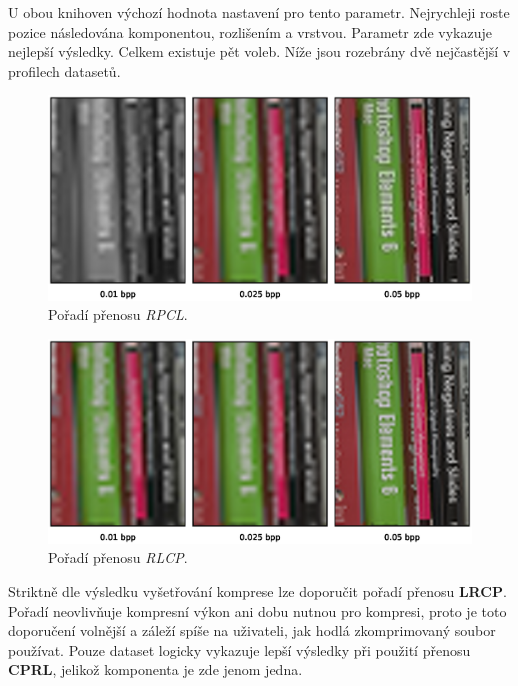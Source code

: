 U obou knihoven výchozí hodnota nastavení pro tento parametr. Nejrychleji roste pozice následována komponentou, rozlišením a vrstvou. Parametr zde vykazuje nejlepší výsledky. Celkem existuje pět voleb. Níže jsou rozebrány dvě nejčastější v profilech datasetů.
\clearpage
\begin{figure}[hbt!]
  \centering
  \hspace*{-0.75cm}
  \includegraphics[width=16cm]{obrazky-figures/order/rpcl.eps}
  \caption{Pořadí přenosu \textit{RPCL}.}
\end{figure}

\begin{figure}[hbt!]
  \centering
  \hspace*{-0.75cm}
  \includegraphics[width=16cm]{obrazky-figures/order/rlcp.eps}
  \caption{Pořadí přenosu \textit{RLCP}.}
\end{figure}

\noindent Striktně dle výsledku vyšetřování komprese lze doporučit pořadí přenosu \textbf{LRCP}. Pořadí neovlivňuje kompresní výkon ani dobu nutnou pro kompresi, proto je toto doporučení volnější a záleží spíše na uživateli, jak hodlá zkomprimovaný soubor používat.  Pouze dataset  logicky vykazuje lepší výsledky při použití přenosu \textbf{CPRL}, jelikož komponenta je zde jenom jedna.


